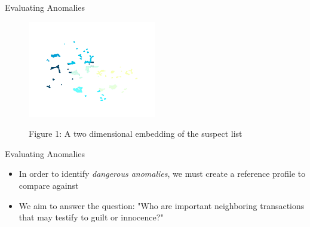 \documentclass[aspectratio=169]{beamer}
\begin{document}
  \begin{frame}{Evaluating Anomalies}
    \begin{center}
      \begin{figure}
        \includegraphics[width=0.5\textwidth]{images/projection.png}
        \label{fig:1}
        \caption{Figure 1: A two dimensional embedding of the suspect list}
      \end{figure}
    \end{center}
  \end{frame}

  \begin{frame}{Evaluating Anomalies}
    \begin{itemize}
      \item In order to identify \textit{dangerous anomalies}, we must create a reference 
      profile to compare against
      \item We aim to answer the question: "Who are important neighboring transactions that 
      may testify to guilt or innocence?" 
    \end{itemize}
    \end{frame}
\end{document}
